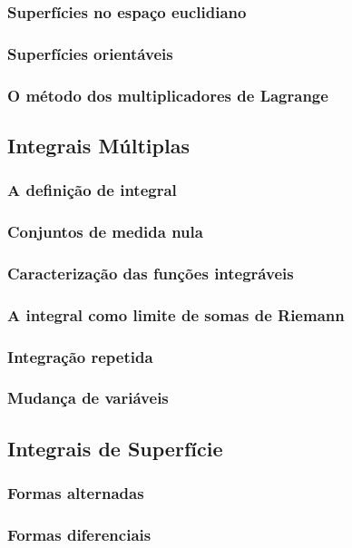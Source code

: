 \documentclass{article}
\theoremstyle{theorem}
\theoremstyle{lemma}
\theoremstyle{definition}
\theoremstyle{remark}
\begin{document}
   \subsubsection{ Superfícies no espaço euclidiano}
   \subsubsection{ Superfícies orientáveis}
   \subsubsection{ O método dos multiplicadores de Lagrange}

\subsection{ Integrais Múltiplas}
   \subsubsection{A definição de integral}
   \subsubsection{Conjuntos de medida nula}
   \subsubsection{Caracterização das funções integráveis}
   \subsubsection{A integral como limite de somas de Riemann}
   \subsubsection{Integração repetida}
   \subsubsection{Mudança de variáveis}

\subsection{ Integrais de Superfície}
   \subsubsection{Formas alternadas}
   \subsubsection{Formas diferenciais}
\end{document}
